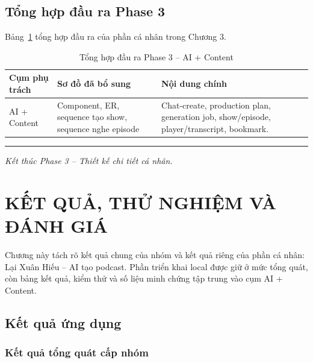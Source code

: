 \documentclass[14pt,a4paper,oneside]{extreport}
\begin{document}
\section{Tổng hợp đầu ra Phase 3}
\label{sec:phase3-summary}

Bảng~\ref{tab:phase3-output} tổng hợp đầu ra của phần cá nhân trong Chương 3.

\begin{table}[H]
\centering
\caption{Tổng hợp đầu ra Phase 3 -- AI + Content}
\label{tab:phase3-output}
\renewcommand{\arraystretch}{1.3}
\scriptsize
\begin{tabularx}{\textwidth}{|l|X|X|}
\hline
\textbf{Cụm phụ trách} & \textbf{Sơ đồ đã bổ sung} & \textbf{Nội dung chính} \\
\hline
AI + Content & Component, ER, sequence tạo show, sequence nghe episode & Chat-create, production plan, generation job, show/episode, player/transcript, bookmark. \\
\hline
\end{tabularx}
\end{table}

\vspace{1cm}
\noindent\rule{\textwidth}{0.4pt}

\noindent
\textit{Kết thúc Phase 3 -- Thiết kế chi tiết cá nhân.}

\clearpage

\chapter{KẾT QUẢ, THỬ NGHIỆM VÀ ĐÁNH GIÁ}
\label{chap:ket-qua}

Chương này tách rõ kết quả chung của nhóm và kết quả riêng của phần cá nhân: Lại Xuân Hiếu -- AI tạo podcast. Phần triển khai local được giữ ở mức tổng quát, còn bảng kết quả, kiểm thử và số liệu minh chứng tập trung vào cụm AI + Content.

\section{Kết quả ứng dụng}
\label{sec:ket-qua-ung-dung}

\subsection{Kết quả tổng quát cấp nhóm}
\end{document}
